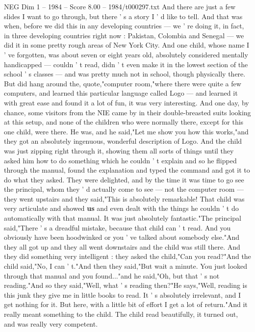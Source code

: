 \begin{textsample}{NEG Dim 1 – 1984 – Score 8.00 – 1984/t000297.txt}
And there are just a few slides I want to go through, but there ' s a story I ' d like to tell.
And that was when, before we did this in any developing countries — we ' re doing it, in fact, in three developing countries right now : Pakistan, Colombia and Senegal — we did it in some pretty rough areas of New York City.
And one child, whose name I ' ve forgotten, was about seven or eight years old, absolutely considered mentally handicapped — couldn ' t read, didn ' t even make it in the lowest section of the school ' s classes — and was pretty much not in school, though physically there.
But did hang around the, quote,"computer room,"where there were quite a few computers, and learned this particular language called Logo — and learned it with great ease and found it a lot of fun, it was very interesting.
And one day, by chance, some visitors from the NIE came by in their double-breasted suits looking at this setup, and none of the children who were normally there, except for this one child, were there.
He was, and he said,"Let me show you how this works,"and they got an absolutely ingenuous, wonderful description of Logo.
And the child was just zipping right through it, showing them all sorts of things until they asked him how to do something which he couldn ' t explain and so he flipped through the manual, found the explanation and typed the command and got it to do what they asked.
They were delighted, and by the time it was time to go see the principal, whom they ' d actually come to see — not the computer room — they went upstairs and they said,"This is absolutely remarkable!
That child was very articulate and showed \textbf{us} and even dealt with the things he couldn ' t do automatically with that manual.
It was just absolutely fantastic."The principal said,"There ' s a dreadful mistake, because that child can ' t read.
And you obviously have been hoodwinked or you ' ve talked about somebody else."And they all got up and they all went downstairs and the child was still there.
And they did something very intelligent : they asked the child,"Can you read?"And the child said,"No, I can ' t."And then they said,"But wait a minute.
You just looked through that manual and you found..."and he said,"Oh, but that ' s not reading."And so they said,"Well, what ' s reading then?"He says,"Well, reading is this junk they give me in little books to read.
It ' s absolutely irrelevant, and I get nothing for it.
But here, with a little bit of effort I get a lot of return."And it really meant something to the child.
The child read beautifully, it turned out, and was really very competent.

\end{textsample}
